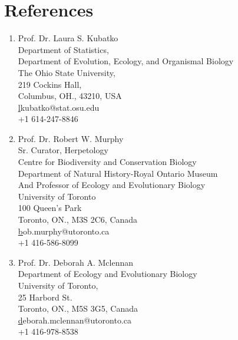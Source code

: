 \documentclass[11pt]{article}
\begin{document}
\newpage

\section*{References}

\begin{enumerate}

\item Prof. Dr. Laura S. Kubatko\\Department of Statistics,\\Department of Evolution, Ecology, and Organismal Biology\\The Ohio State University,\\219 Cockins Hall,\\Columbus, OH., 43210, USA\\\href{lkubatko@stat.osu.edu}lkubatko@stat.osu.edu\\+1 614-247-8846\\

\item Prof. Dr. Robert W. Murphy\\Sr. Curator, Herpetology\\Centre for Biodiversity and Conservation Biology\\Department of Natural History-Royal Ontario Museum\\And Professor of Ecology and Evolutionary Biology\\ University of Toronto\\100 Queen’s Park\\Toronto, ON., M3S 2C6, Canada\\\href{bob.murphy@utoronto.ca}bob.murphy@utoronto.ca\\+1 416-586-8099

\item Prof. Dr. Deborah A. Mclennan\\Department of Ecology and Evolutionary Biology\\University of Toronto,\\25 Harbord St.\\Toronto, ON., M5S 3G5, Canada \\\href{deborah.mclennan@utoronto.ca}deborah.mclennan@utoronto.ca\\+1 416-978-8538
\end{enumerate}









\end{document}
